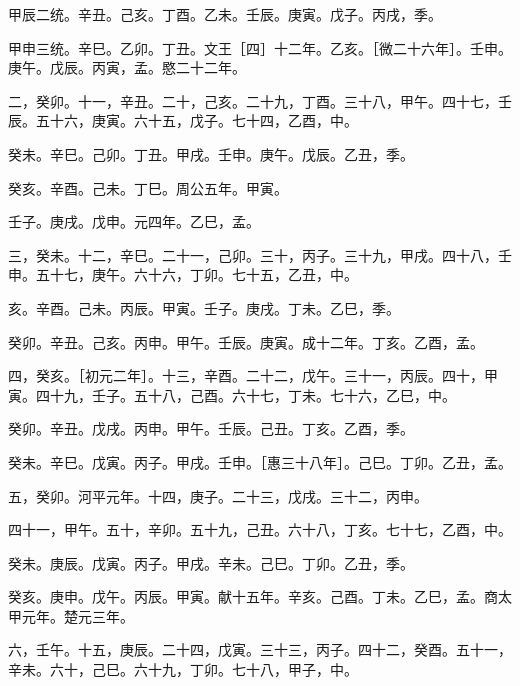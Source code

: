 \documentclass[12pt,UTF8]{ctexbook}
\begin{document}
甲辰二统。辛丑。己亥。丁酉。乙未。壬辰。庚寅。戊子。丙戌，季。



甲申三统。辛巳。乙卯。丁丑。文王［四］十二年。乙亥。［微二十六年］。壬申。庚午。戊辰。丙寅，孟。愍二十二年。



二，癸卯。十一，辛丑。二十，己亥。二十九，丁酉。三十八，甲午。四十七，壬辰。五十六，庚寅。六十五，戊子。七十四，乙酉，中。



癸未。辛巳。己卯。丁丑。甲戌。壬申。庚午。戊辰。乙丑，季。



癸亥。辛酉。己未。丁巳。周公五年。甲寅。



壬子。庚戌。戊申。元四年。乙巳，孟。



三，癸未。十二，辛巳。二十一，己卯。三十，丙子。三十九，甲戌。四十八，壬申。五十七，庚午。六十六，丁卯。七十五，乙丑，中。



亥。辛酉。己未。丙辰。甲寅。壬子。庚戌。丁未。乙巳，季。



癸卯。辛丑。己亥。丙申。甲午。壬辰。庚寅。成十二年。丁亥。乙酉，孟。



四，癸亥。［初元二年］。十三，辛酉。二十二，戊午。三十一，丙辰。四十，甲寅。四十九，壬子。五十八，己酉。六十七，丁未。七十六，乙巳，中。



癸卯。辛丑。戊戌。丙申。甲午。壬辰。己丑。丁亥。乙酉，季。



癸未。辛巳。戊寅。丙子。甲戌。壬申。［惠三十八年］。己巳。丁卯。乙丑，孟。



五，癸卯。河平元年。十四，庚子。二十三，戊戌。三十二，丙申。



四十一，甲午。五十，辛卯。五十九，己丑。六十八，丁亥。七十七，乙酉，中。



癸未。庚辰。戊寅。丙子。甲戌。辛未。己巳。丁卯。乙丑，季。



癸亥。庚申。戊午。丙辰。甲寅。献十五年。辛亥。己酉。丁未。乙巳，孟。商太甲元年。楚元三年。



六，壬午。十五，庚辰。二十四，戊寅。三十三，丙子。四十二，癸酉。五十一，辛未。六十，己巳。六十九，丁卯。七十八，甲子，中。
\end{document}
